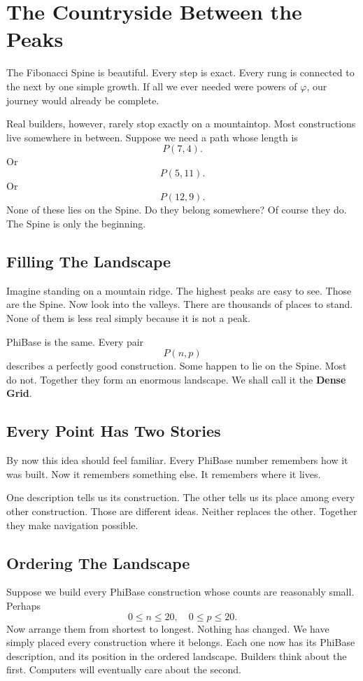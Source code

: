 \chapter{The Countryside Between the Peaks}
\label{stone:dense-grid}

The Fibonacci Spine is beautiful. Every step is exact. Every rung is connected to the next by one simple growth. If all we ever needed were powers of \(\varphi\), our journey would already be complete.

Real builders, however, rarely stop exactly on a mountaintop. Most constructions live somewhere in between. Suppose we need a path whose length is
\[
P(7,4).
\]
Or
\[
P(5,11).
\]
Or
\[
P(12,9).
\]
None of these lies on the Spine. Do they belong somewhere? Of course they do. The Spine is only the beginning.

\section*{Filling The Landscape}

Imagine standing on a mountain ridge. The highest peaks are easy to see. Those are the Spine. Now look into the valleys. There are thousands of places to stand. None of them is less real simply because it is not a peak.

PhiBase is the same. Every pair
\[
P(n,p)
\]
describes a perfectly good construction. Some happen to lie on the Spine. Most do not. Together they form an enormous landscape. We shall call it the \textbf{Dense Grid}.

\section*{Every Point Has Two Stories}

By now this idea should feel familiar. Every PhiBase number remembers how it was built. Now it remembers something else. It remembers where it lives.

One description tells us its construction. The other tells us its place among every other construction. Those are different ideas. Neither replaces the other. Together they make navigation possible.

\section*{Ordering The Landscape}

Suppose we build every PhiBase construction whose counts are reasonably small. Perhaps
\[
0\le n\le 20, \quad 0\le p\le 20.
\]
Now arrange them from shortest to longest. Nothing has changed. We have simply placed every construction where it belongs. Each one now has its PhiBase description, and its position in the ordered landscape. Builders think about the first. Computers will eventually care about the second.


